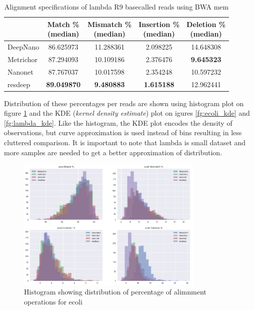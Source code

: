 \documentclass[times, utf8, diplomski, numeric, english]{fer}
\begin{document}
\begin{table}[H]
	\caption{Alignment specifications of lambda R9 basecalled reads using BWA mem}
	\label{tbl:lambda_rates_bwa}
	\centering
	\begin{tabular}{lcccc}
		\toprule
		{} &  \thead{Match \% \\(median)} &  \thead{Mismatch \% \\(median)} &  \thead{Insertion \% \\(median)} &  \thead{Deletion \% \\(median)} \\
		\midrule
		
		DeepNano   &                  86.625973 &                     11.288361 &                       2.098225 &                     14.648308 \\
		Metrichor  &                  87.294093 &                     10.109186 &                       2.376476 &                      \textbf{9.645323 }\\
		Nanonet    &                  87.767037 &                     10.017598 &                       2.354248 &                     10.597232 \\
		resdeep    &                 \textbf{ 89.049870} &                     \textbf{ 9.480883} &                       \textbf{1.615188 }&                     12.962441 \\
		\bottomrule
	\end{tabular}
	
\end{table}


Distribution of these percentages per reads are shown using  histogram plot on figure \ref{fg:hist} and the KDE (\textit{kernel density estimate}) plot on igures \ref{fg:ecoli_kde} and \ref{fg:lambda_kde}. Like the histogram, the KDE plot encodes the density of observations, but curve approximation is used instead of bins resulting in less cluttered comparison. 
It is important to note that lambda is small dataset and more samples are needed to get a better approximation of distribution.

\begin{figure}[!htb]
	\begin{center}
		\includegraphics[width=0.8\textwidth]{./imgs/results/ecoli/hist_20.png}
		\caption{Histogram showing distribution of percentage of alimnment operations for ecoli}
		\label{fg:hist}
	\end{center}
\end{figure}
\end{document}
